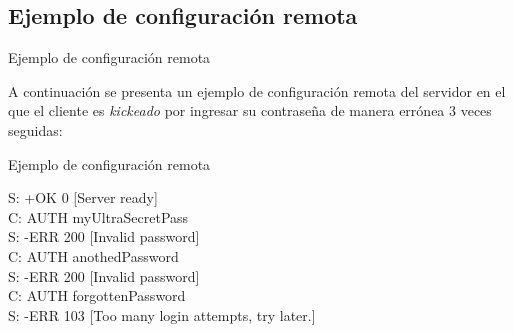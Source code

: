 \documentclass{beamer}
\begin{document}
\subsection{Ejemplo de configuración remota}
\begin{frame}{Ejemplo de configuración remota}
\par A continuación se presenta un ejemplo de configuración remota del servidor en el que el cliente es \textit{kickeado} por ingresar su contraseña de manera errónea 3 veces seguidas:

\end{frame}

\begin{frame}[fragile]{Ejemplo de configuración remota}
\begin{block}{}
S: +OK 0 [Server ready]\\
C: AUTH myUltraSecretPass\\
S: -ERR 200 [Invalid password]\\
C: AUTH anothedPassword\\
S: -ERR 200 [Invalid password]\\
C: AUTH forgottenPassword\\
S: -ERR 103 [Too many login attempts, try later.]
\end{block}
\end{frame}
\end{document}
